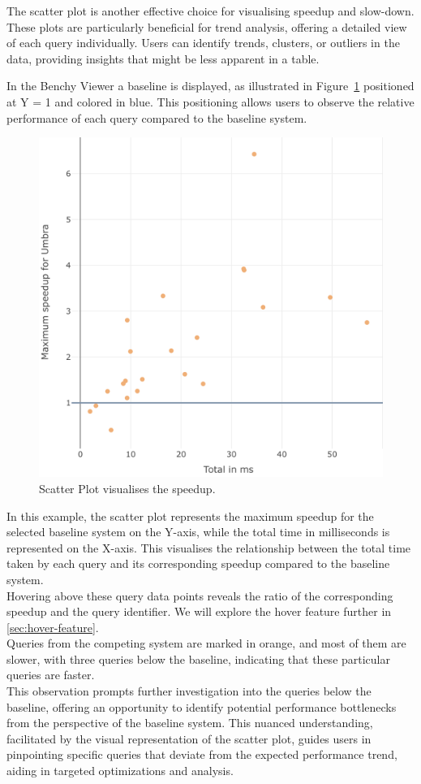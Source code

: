 The scatter plot is another effective choice for visualising speedup and slow-down. These plots are particularly beneficial for trend analysis, offering a detailed view of each query individually. Users can identify trends, clusters, or outliers in the data, providing insights that might be less apparent in a table.

In the Benchy Viewer a baseline is displayed, as illustrated in Figure~\ref{fig:scatter} positioned at Y = 1 and colored in blue. This positioning allows users to observe the relative performance of each query compared to the baseline system.

\begin{figure}[h]
  \centering
  \includegraphics[width=0.7\linewidth]{figures/bsp-scatter.png}
  \caption{Scatter Plot visualises the speedup.}
  \label{fig:scatter}
\end{figure}

In this example, the scatter plot represents the maximum speedup for the selected baseline system on the Y-axis, while the total time in milliseconds is represented on the X-axis. This visualises the relationship between the total time taken by each query and its corresponding speedup compared to the baseline system.\\
Hovering above these query data points reveals the ratio of the corresponding speedup and the query identifier. We will explore the hover feature further in \ref{sec:hover-feature}.\\
Queries from the competing system are marked in orange, and most of them are slower, with three queries below the baseline, indicating that these particular queries are faster.\\
This observation prompts further investigation into the queries below the baseline, offering an opportunity to identify potential performance bottlenecks from the perspective of the baseline system. This nuanced understanding, facilitated by the visual representation of the scatter plot, guides users in pinpointing specific queries that deviate from the expected performance trend, aiding in targeted optimizations and analysis.

